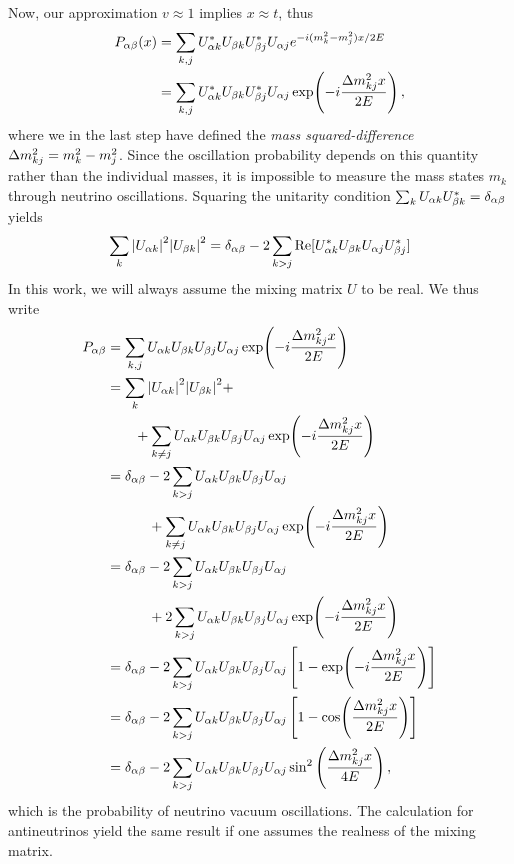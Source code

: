 Now, our approximation $v\approx 1$ implies $x\approx t $, thus
\begin{align}
    P_{\ab}(x) &= \sum_{k,j} U^*_{\a k}U_{\b k}U^*_{\b j}U_{\a j} e^{-i(m_k^2-m_j^2)x/2E} \nonumber \\
                       &= \sum_{k,j} U^*_{\a k}U_{\b k}U^*_{\b j}U_{\a j} \exp(-i\frac{\dm_{kj}x}{2E})\,,
\end{align}
where we in the last step have defined the \emph{mass squared-difference} $\dm_{kj} = m_k^2 - m_j^2$. Since the oscillation probability depends on this quantity
rather than the individual masses, it is impossible
to measure the mass states $m_k$ through neutrino oscillations.
Squaring the unitarity condition $\sum_k U_{\alpha k}U_{\beta k}^* = \delta_{\alpha \beta}$ yields 
\begin{align}
    \sum_k \abs{U_{\alpha k}}^2\abs{U_{\beta k}}^2 = \delta_{\alpha \beta} - 2 \sum_{k>j}\Re[U_{\alpha k}^* U_{\beta k} U_{\alpha j} U_{\beta j}^*]
\end{align}
In this work, we will always assume the mixing matrix $U$ to be real. 
We thus write 
\begin{align}\label{eq:Pab}%
    P_{\ab} &= \sum_{k,j} U_{\a k}U_{\b k}U_{\b j}U_{\a j} \exp(-i\frac{\dm_{kj}x}{2E}) \nonumber \\
            &=  \sum_k \abs{U_{\a k}}^2\abs{U_{\b k}}^2 + \nonumber \\
            &\hspace{2em}+ \sum_{k \neq j} U_{\a k}U_{\b k}U_{\b j}U_{\a j} \exp(-i\frac{\dm_{kj}x}{2E}) \nonumber \\
            &= \delta_{\a \b} - 2 \sum_{k>j}U_{\a k} U_{\b k} U_{\b j} U_{\a j} \nonumber \\
            & \hspace{3em}+\sum_{k \neq j} U_{\a k}U_{\b k}U_{\b j}U_{\a j} \exp(-i\frac{\dm_{kj}x}{2E}) \nonumber \\
            &= \delta_{\a \b} - 2 \sum_{k>j}U_{\a k} U_{\b k} U_{\b j} U_{\a j} \nonumber \\
            &\hspace{3em}+ 2\sum_{k > j} U_{\a k}U_{\b k}U_{\b j}U_{\a j} \exp(-i\frac{\dm_{kj}x}{2E}) \nonumber \\
            &= \delta_{\a \b} - 2\sum_{k > j} U_{\a k}U_{\b k}U_{\b j}U_{\a j} \left[1-\exp(-i\frac{\dm_{kj}x}{2E})\right] \nonumber \\
            &= \delta_{\a \b} - 2\sum_{k > j} U_{\a k}U_{\b k}U_{\b j}U_{\a j} \left[1-\cos(\frac{\dm_{kj}x}{2E})\right] \nonumber \\
            &= \delta_{\a \b} - 2\sum_{k > j} U_{\a k}U_{\b k}U_{\b j}U_{\a j} \sin^2{\left(\frac{\dm_{kj}x}{4E}\right)}\,,
\end{align}
which is the probability of neutrino vacuum oscillations. %
The calculation for antineutrinos yield the same result if one assumes the realness of the mixing matrix. 


